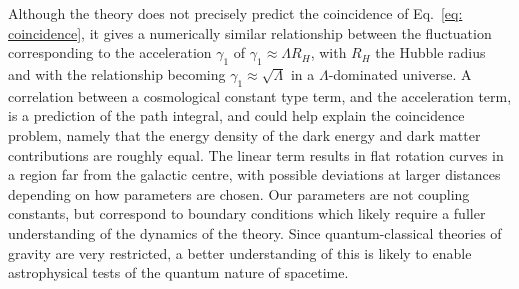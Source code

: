\documentclass[aps,pra,amsmath,amssymb,amsthm,floatfix,nofootinbib,notitlepage,superscriptaddress,10pt]{revtex4-2}
\begin{document}
Although the theory does not precisely predict the coincidence of Eq.~\eqref{eq: coincidence}, it gives a numerically similar relationship between the fluctuation corresponding to the acceleration $\gamma_1$ of
$\gamma_1\approx\Lambda R_H$, with $R_H$ the Hubble radius and with the relationship becoming $\gamma_1\approx\sqrt{\Lambda}$ in a $\Lambda$-dominated universe. A correlation between a cosmological constant type term, and the acceleration term, is a prediction of the path integral, and could help explain the coincidence problem, namely that the energy density of the dark energy and dark matter contributions are roughly equal. The linear term
results in flat rotation curves in a region far from the galactic centre,  with possible deviations at larger distances depending on how parameters are chosen. Our parameters are not coupling constants, but correspond to boundary conditions which likely require a fuller understanding of the dynamics of the theory. Since quantum-classical theories of gravity are very restricted, a better understanding of this is likely to enable astrophysical tests of the quantum nature of spacetime. 
\end{document}
